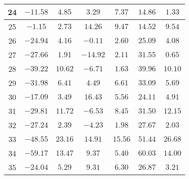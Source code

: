 \begin{table}[H]
\begin{tabular}{|c|c|c|c|c|c|c|}
                        24  &   $-11.58$  &  $4.85$   &   $3.29$    &  $7.37$  &  $14.86$   &  $1.33$   \\ \hline
                        25  &   $-1.15$   &  $2.73$   &   $14.26$   &  $9.47$  &  $14.52$   &  $9.54$   \\ \hline
                        26  &   $-24.94$  &  $4.16$   &   $-0.11$   &  $2.60$  &  $25.09$   &  $4.08$   \\ \hline
                        27  &   $-27.66$  &  $1.91$   &   $-14.92$  &  $2.11$  &  $31.55$   &  $0.65$   \\ \hline
                        28  &   $-39.22$  &  $10.62$  &   $-6.71$   &  $1.63$  &  $39.96$   &  $10.10$  \\ \hline
                        29  &   $-31.98$  &  $6.41$   &   $4.49$    &  $6.61$  &  $33.09$   &  $5.69$   \\ \hline
                        30  &   $-17.09$  &  $3.49$   &   $16.43$   &  $5.56$  &  $24.11$   &  $4.91$   \\ \hline
                        31  &   $-29.81$  &  $11.72$  &   $-6.53$   &  $8.45$  &  $31.50$   &  $12.15$  \\ \hline
                        32  &   $-27.24$  &  $2.39$   &   $-4.23$   &  $1.98$  &  $27.67$   &  $2.03$   \\ \hline
                        33  &   $-48.55$  &  $23.16$  &   $14.91$   &  $15.56$ &  $51.44$   &  $26.68$  \\ \hline
                        34  &   $-59.17$  &  $13.47$  &   $9.37$    &  $5.40$  &  $60.03$   &  $14.00$  \\ \hline
                        35  &   $-24.04$  &  $5.29$   &   $9.31$    &  $6.30$  &  $26.87$   &  $3.21$   \\ \hline
        \end{tabular}
    \label{tab:media_fisica_4_aleatoria} 
\end{table}


